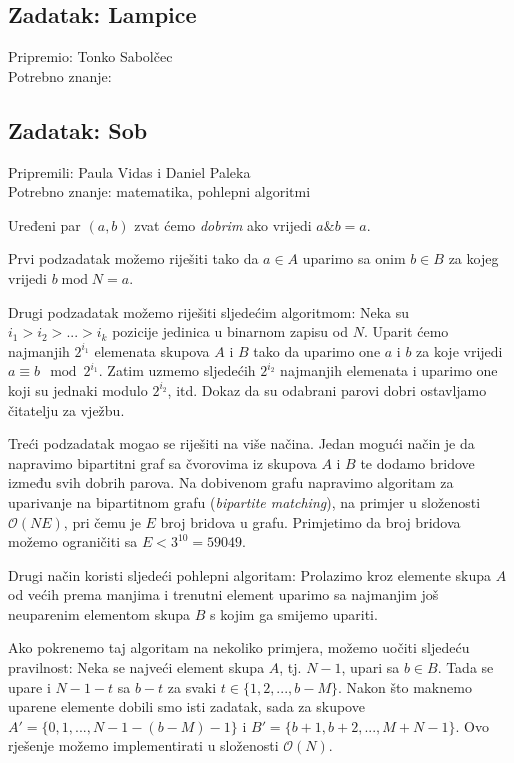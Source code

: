 \documentclass[a4paper]{article}
\begin{document}
\subsection*{Zadatak: Lampice}
\textsf{Pripremio: Tonko Sabolčec}\\
\textsf{Potrebno znanje: }

\subsection*{Zadatak: Sob}
\textsf{Pripremili: Paula Vidas i Daniel Paleka}\\
\textsf{Potrebno znanje: matematika, pohlepni algoritmi}

Uređeni par $(a, b)$ zvat ćemo \emph{dobrim} ako vrijedi $a \mathbin\& b = a$.

Prvi podzadatak možemo riješiti tako da $a \in A$ uparimo sa onim $b \in B$ za
kojeg vrijedi $b \mathbin{\textrm{mod}} N = a$.

Drugi podzadatak možemo riješiti sljedećim algoritmom: Neka su
$i_1 > i_2 > ... > i_k$ pozicije jedinica u binarnom zapisu od $N$. Uparit ćemo
najmanjih $2^{i_1}$ elemenata skupova $A$ i $B$ tako da uparimo one $a$ i $b$
za koje vrijedi $a \equiv b \mod 2^{i_1}$. Zatim uzmemo sljedećih $2^{i_2}$
najmanjih elemenata i uparimo one koji su jednaki modulo $2^{i_2}$, itd.
Dokaz da su odabrani parovi dobri ostavljamo čitatelju za vježbu.

Treći podzadatak mogao se riješiti na više načina. Jedan mogući način je da
napravimo bipartitni graf sa čvorovima iz skupova $A$ i $B$ te dodamo bridove
između svih dobrih parova. Na dobivenom grafu napravimo algoritam za uparivanje
na bipartitnom grafu (\emph{bipartite matching}), na primjer u složenosti
$\mathcal{O}(NE)$, pri čemu je $E$ broj bridova u grafu.
Primjetimo da broj bridova možemo ograničiti sa $E < 3^{10} = 59049$.

Drugi način koristi sljedeći pohlepni algoritam: Prolazimo kroz elemente skupa
$A$ od većih prema manjima i trenutni element uparimo sa najmanjim još
neuparenim elementom skupa $B$ s kojim ga smijemo upariti.

Ako pokrenemo taj algoritam na nekoliko primjera, možemo uočiti sljedeću
pravilnost: Neka se najveći element skupa $A$, tj. $N - 1$, upari sa $b \in B$.
Tada se upare i $N - 1 - t$ sa $b - t$ za svaki $t \in \{1, 2, ..., b - M\}$.
Nakon što maknemo uparene elemente dobili smo isti zadatak, sada za skupove
$A' = \{0, 1, ..., N - 1 - (b - M) - 1\}$ i
$B' = \{b + 1, b + 2, ..., M + N - 1\}$. Ovo rješenje možemo implementirati u
složenosti $\mathcal{O}(N)$.
\end{document}
